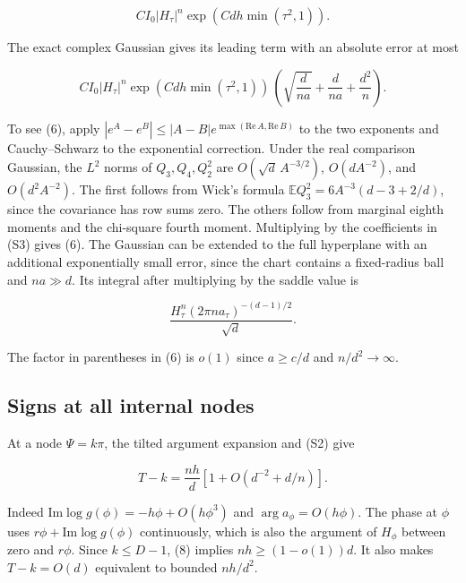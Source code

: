 \begin{equation}
C I_0|H_\tau|^n \exp(Cdh\min(\tau^2,1)).
\tag{S5}
\end{equation}

The exact complex Gaussian gives its leading term with an absolute error at most

\begin{equation}
C I_0|H_\tau|^n \exp(Cdh\min(\tau^2,1))\,
\left(\sqrt{\frac d{na}}+\frac d{na}+\frac{d^2}{n}\right).
\tag{S6}
\end{equation}

To see (6), apply $|e^A-e^B|\le|A-B|e^{\max(\mathrm{Re}\,A,\mathrm{Re}\,B)}$ to the two exponents and Cauchy--Schwarz to the exponential correction. Under the real comparison Gaussian, the $L^2$ norms of $Q_3,Q_4,Q_2^2$ are $O(\sqrt d\,A^{-3/2})$, $O(d A^{-2})$, and $O(d^2 A^{-2})$. The first follows from Wick's formula $\mathbb E Q_3^2=6A^{-3}(d-3+2/d)$, since the covariance has row sums zero. The others follow from marginal eighth moments and the chi-square fourth moment. Multiplying by the coefficients in (S3) gives (6). The Gaussian can be extended to the full hyperplane with an additional exponentially small error, since the chart contains a fixed-radius ball and $na\gg d$. Its integral after multiplying by the saddle value is

\begin{equation}
\frac{H_\tau^n(2\pi n a_\tau)^{-(d-1)/2}}{\sqrt d}.
\tag{S7}
\end{equation}

The factor in parentheses in (6) is $o(1)$ since $a\ge c/d$ and $n/d^2\to\infty$.

\subsection{Signs at all internal nodes}

At a node $\Psi=k\pi$, the tilted argument expansion and (S2) give

\begin{equation}
T-k=\frac{nh}{d}\left[1+O(d^{-2}+d/n)\right].
\tag{S8}
\end{equation}

Indeed $\mathrm{Im}\log g(\phi)=-h\phi+O(h\phi^3)$ and $\arg a_\phi=O(h\phi)$. The phase at $\phi$ uses $r\phi+\mathrm{Im}\log g(\phi)$ continuously, which is also the argument of $H_\phi$ between zero and $r\phi$. Since $k\le D-1$, (8) implies $nh\ge(1-o(1))d$. It also makes $T-k=O(d)$ equivalent to bounded $nh/d^2$.

